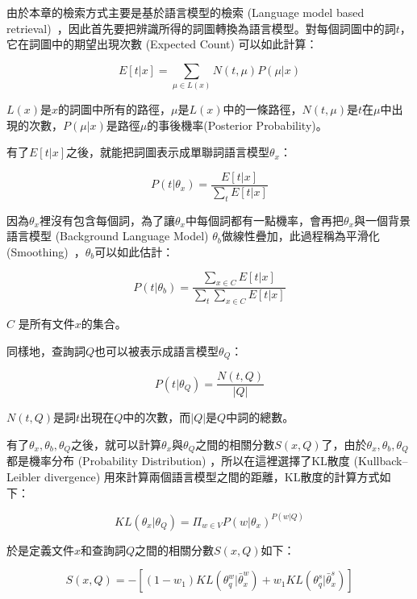由於本章的檢索方式主要是基於語言模型的檢索 (Language model based retrieval)~\cite{zhai2008statistical, chia2010statistical}，因此首先要把辨識所得的詞圖轉換為語言模型。對每個詞圖中的詞$t$，它在詞圖中的期望出現次數 (Expected Count) 可以如此計算：

\begin{equation}
E[t|x] = \sum_{\mu \in L(x)} N(t, \mu)P(\mu|x)
\end{equation}

$L(x)$是$x$的詞圖中所有的路徑，$\mu$是$L(x)$中的一條路徑，$N(t, \mu)$是$t$在$\mu$中出現的次數，$P(\mu|x)$是路徑$\mu$的事後機率(Posterior Probability)。

有了$E[t|x]$之後，就能把詞圖表示成單聯詞語言模型$\theta_x$：

\begin{equation}
P(t|\theta_x) = \frac{E[t|x]}{\sum_tE[t|x]}
\end{equation}

因為$\theta_x$裡沒有包含每個詞，為了讓$\theta_x$中每個詞都有一點機率，會再把$\theta_x$與一個背景語言模型 (Background Language Model) $\theta_b$做線性疊加，此過程稱為平滑化 (Smoothing)~\cite{zhai2001study}，$\theta_b$可以如此估計：

\begin{equation}
P(t|\theta_b) = \frac{\sum_{x\in C}E[t|x]}{\sum_t\sum_{x\in C}E[t|x]}
\end{equation}

$C$ 是所有文件$x$的集合。

同樣地，查詢詞$Q$也可以被表示成語言模型$\theta_Q$：

\begin{equation}
P(t|\theta_Q) = \frac{N(t, Q)}{|Q|}   
\end{equation}

$N(t, Q)$是詞$t$出現在$Q$中的次數，而$|Q|$是$Q$中詞的總數。

有了$\theta_x, \theta_b, \theta_Q$之後，就可以計算$\theta_x$與$\theta_Q$之間的相關分數$S(x, Q)$了，由於$\theta_x, \theta_b, \theta_Q$都是機率分布 (Probability Distribution) ，所以在這裡選擇了KL散度 (Kullback–Leibler divergence) 用來計算兩個語言模型之間的距離，KL散度的計算方式如下：

\begin{equation}
KL(\theta_x | \theta_Q) = \Pi_{w\in V}P(w|\theta_x)^{P(w|Q)}
\end{equation}

於是定義文件$x$和查詢詞$Q$之間的相關分數$S(x, Q)$如下：

\begin{equation}
S(x, Q) = -[(1-w_1)KL(\theta_q^w|\bar{\theta}^w_x) + w_1KL(\theta_q^s|\bar{\theta}_x^s)]
\end{equation}

